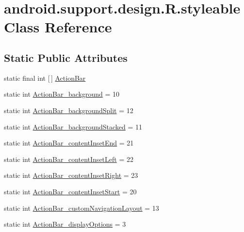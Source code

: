 \hypertarget{classandroid_1_1support_1_1design_1_1R_1_1styleable}{}\section{android.\+support.\+design.\+R.\+styleable Class Reference}
\label{classandroid_1_1support_1_1design_1_1R_1_1styleable}
\subsection*{Static Public Attributes}
\begin{DoxyCompactItemize}
\item 
static final int \mbox{[}$\,$\mbox{]} \hyperlink{classandroid_1_1support_1_1design_1_1R_1_1styleable_ab795220a96557d11f8c21359b95bed82}{Action\+Bar}
\item 
static int \hyperlink{classandroid_1_1support_1_1design_1_1R_1_1styleable_af9f6c6b106dc74dcd8336736d77ea6ba}{Action\+Bar\+\_\+background} = 10
\item 
static int \hyperlink{classandroid_1_1support_1_1design_1_1R_1_1styleable_abdc8b34e1d44d2cbe5ba60c429ff7c24}{Action\+Bar\+\_\+background\+Split} = 12
\item 
static int \hyperlink{classandroid_1_1support_1_1design_1_1R_1_1styleable_a6efbd40c875995ff58dd2e0851d81c20}{Action\+Bar\+\_\+background\+Stacked} = 11
\item 
static int \hyperlink{classandroid_1_1support_1_1design_1_1R_1_1styleable_afbb050c8aaf116cb242a091ccb7c5494}{Action\+Bar\+\_\+content\+Inset\+End} = 21
\item 
static int \hyperlink{classandroid_1_1support_1_1design_1_1R_1_1styleable_ac3914ae6a9e8b6f287ff67404ab1e659}{Action\+Bar\+\_\+content\+Inset\+Left} = 22
\item 
static int \hyperlink{classandroid_1_1support_1_1design_1_1R_1_1styleable_ae5f3307b79082ad75d0a290ff147ad9b}{Action\+Bar\+\_\+content\+Inset\+Right} = 23
\item 
static int \hyperlink{classandroid_1_1support_1_1design_1_1R_1_1styleable_a294d9e006ce1ce1efabd52d819b94bb8}{Action\+Bar\+\_\+content\+Inset\+Start} = 20
\item 
static int \hyperlink{classandroid_1_1support_1_1design_1_1R_1_1styleable_a89b2c279c58515d140466f1c0f360aa1}{Action\+Bar\+\_\+custom\+Navigation\+Layout} = 13
\item 
static int \hyperlink{classandroid_1_1support_1_1design_1_1R_1_1styleable_abddf5b63a010ab2e2078e9c46e36e80c}{Action\+Bar\+\_\+display\+Options} = 3

\end{DoxyCompactItemize}
